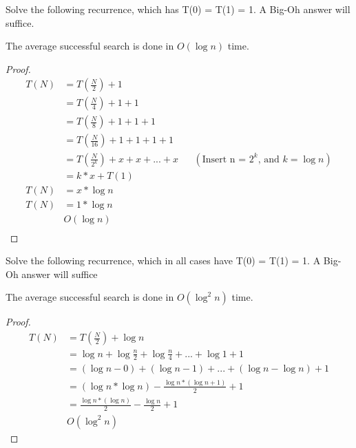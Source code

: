 \documentclass[10pt]{article}
\newenvironment{exercise}[2][Exercise]{\begin{trivlist}
\item[\hskip \labelsep {\bfseries #1}\hskip \labelsep {\bfseries #2.}]}{\end{trivlist}}
\newenvironment{solution}[2][Solution]{\begin{trivlist}
\item[\hskip \labelsep {\bfseries #1}\hskip \labelsep {\bfseries #2.}]}{\end{trivlist}}
\theoremstyle{definition}
\begin{document}
\begin{exercise}{(4)} %
Solve the following recurrence, which has T(0) = T(1) = 1. A Big-Oh answer will suffice.
\end{exercise}

\begin{solution}{(4)}
The average successful search is done in $O(\log n)$ time.
\begin{proof}
\begin{align*}
T(N) & = T(\frac{N}{2}) + 1\\
& = T(\frac{N}{4}) + 1 + 1\\
& = T(\frac{N}{8}) + 1 + 1 + 1\\
& = T(\frac{N}{16}) + 1 + 1 + 1 + 1\\
& = T(\frac{N}{2^k}) + x + x + ... + x && (\text{Insert n = $2^k$, and $k = \log n$})\\
& = k * x + T(1)\\
T(N) & = x*\log n\\
T(N) & = 1*\log n\\
 & O(\log n)\\
\end{align*}
\end{proof}
\end{solution}



\begin{exercise}{(5)} %
Solve the following recurrence, which in all cases have T(0) = T(1) = 1. A Big-Oh answer will suffice
\end{exercise}

\begin{solution}{(5)}
The average successful search is done in $O(\log^{2} n)$ time.
\begin{proof}
\begin{align*}
T(N)  & = T(\frac{N}{2}) + \log n\\
& = \log n + \log{\frac{n}{2}}+ \log{\frac{n}{4}} + ...+ \log 1 + 1\\
& = (\log n - 0) + (\log n - 1) + ... + (\log n - \log n) + 1\\
& = (\log n *  \log n) - \frac{\log n * (\log n + 1)}{2} + 1\\
& = \frac{\log n * (\log n)}{2} - \frac{\log n}{2} + 1\\
& O(\log^2 n)
\end{align*}
\end{proof}
\end{solution}



 
\end{document}
